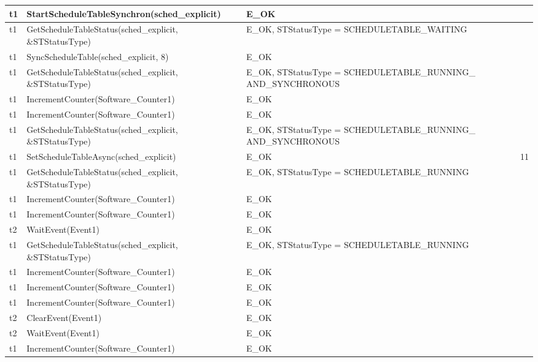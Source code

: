 \documentclass[10pt]{article}
\newlength{\Li}\settowidth{\Li}{Running}
\newlength{\Lii}\setlength{\Lii}{7cm}
\newlength{\Liiii}\setlength{\Liiii}{0.9cm}
\newlength{\Liii}\setlength{\Liii}{\textwidth} \addtolength{\Liii}{-\Li} \addtolength{\Liii}{-\Lii} \addtolength{\Liii}{-\Liiii}
\begin{document}
	\begin{supertabular}{|p{\Li}|p{\Lii}|p{\Liii}|p{\Liiii}|} \hline 
	t1		& StartScheduleTableSynchron(sched\_explicit)					& E\_OK																	& \\ \hline
	t1		& GetScheduleTableStatus(sched\_explicit, \&STStatusType)			& E\_OK, STStatusType = SCHEDULETABLE\_WAITING								& \\ \hline
	t1		& SyncScheduleTable(sched\_explicit, 8)							& E\_OK																	& \\ \hline
	t1		& GetScheduleTableStatus(sched\_explicit, \&STStatusType)			& E\_OK, STStatusType = SCHEDULETABLE\_RUNNING\_ AND\_SYNCHRONOUS		& \\ \hline
	t1		& IncrementCounter(Software\_Counter1)						& E\_OK																	& \\ \hline
	t1		& IncrementCounter(Software\_Counter1)						& E\_OK																	& \\ \hline
	t1		& GetScheduleTableStatus(sched\_explicit, \&STStatusType)			& E\_OK, STStatusType = SCHEDULETABLE\_RUNNING\_ AND\_SYNCHRONOUS		& \\ \hline
	t1		& SetScheduleTableAsync(sched\_explicit)						& E\_OK																	& 11 \\ \hline
	t1		& GetScheduleTableStatus(sched\_explicit, \&STStatusType)			& E\_OK, STStatusType = SCHEDULETABLE\_RUNNING 							& \\ \hline
	t1		& IncrementCounter(Software\_Counter1)						& E\_OK																	& \\ \hline
	t1		& IncrementCounter(Software\_Counter1)						& E\_OK																	& \\ \hline
	t2		& WaitEvent(Event1)											& E\_OK																	& \\ \hline
	t1		& GetScheduleTableStatus(sched\_explicit, \&STStatusType)			& E\_OK, STStatusType = SCHEDULETABLE\_RUNNING 							& \\ \hline
	t1		& IncrementCounter(Software\_Counter1)						& E\_OK																	& \\ \hline
	t1		& IncrementCounter(Software\_Counter1)						& E\_OK																	& \\ \hline
	t1		& IncrementCounter(Software\_Counter1)						& E\_OK																	& \\ \hline
	t2		& ClearEvent(Event1)										& E\_OK																	& \\ \hline
	t2		& WaitEvent(Event1)											& E\_OK																	& \\ \hline
	t1		& IncrementCounter(Software\_Counter1)						& E\_OK																	& \\ \hline

\end{supertabular}
\end{document}
